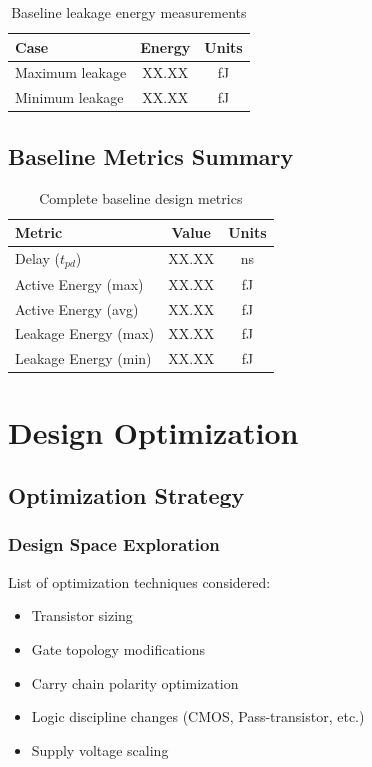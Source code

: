 \documentclass[12pt,letterpaper]{article}
\begin{document}
\begin{table}[H]
\centering
\caption{Baseline leakage energy measurements}
\label{tab:baseline_leakage}
\begin{tabular}{@{}lcc@{}}
\toprule
\textbf{Case} & \textbf{Energy} & \textbf{Units} \\
\midrule
Maximum leakage & XX.XX & fJ \\
Minimum leakage & XX.XX & fJ \\
\bottomrule
\end{tabular}
\end{table}

\subsection{Baseline Metrics Summary}

\begin{table}[H]
\centering
\caption{Complete baseline design metrics}
\label{tab:baseline_summary}
\begin{tabular}{@{}lcc@{}}
\toprule
\textbf{Metric} & \textbf{Value} & \textbf{Units} \\
\midrule
Delay ($t_{pd}$) & XX.XX & ns \\
Active Energy (max) & XX.XX & fJ \\
Active Energy (avg) & XX.XX & fJ \\
Leakage Energy (max) & XX.XX & fJ \\
Leakage Energy (min) & XX.XX & fJ \\
\bottomrule
\end{tabular}
\end{table}

\section{Design Optimization}
\label{sec:optimization}


\subsection{Optimization Strategy}

\subsubsection{Design Space Exploration}

List of optimization techniques considered:
\begin{itemize}
    \item Transistor sizing
    \item Gate topology modifications
    \item Carry chain polarity optimization
    \item Logic discipline changes (CMOS, Pass-transistor, etc.)
    \item Supply voltage scaling
\end{itemize}
\end{document}

